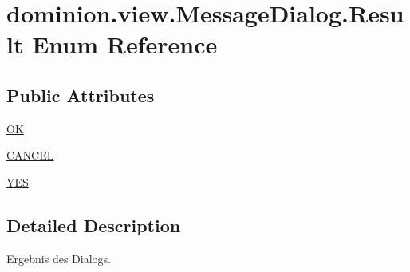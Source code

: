 \hypertarget{enumdominion_1_1view_1_1MessageDialog_1_1Result}{\section{dominion.\-view.\-Message\-Dialog.\-Result \-Enum \-Reference}
\label{enumdominion_1_1view_1_1MessageDialog_1_1Result}
}
\subsection*{\-Public \-Attributes}
\begin{DoxyCompactItemize}
\item 
\hyperlink{enumdominion_1_1view_1_1MessageDialog_1_1Result_a2594daef8b5aca7f65160b3f7d778d9e}{\-O\-K}
\item 
\hyperlink{enumdominion_1_1view_1_1MessageDialog_1_1Result_a33f35d9f5fd6479a8b0f0e93ff2c688d}{\-C\-A\-N\-C\-E\-L}
\item 
\hyperlink{enumdominion_1_1view_1_1MessageDialog_1_1Result_add8d3139246db9219a3ab01a8634cd13}{\-Y\-E\-S}
\end{DoxyCompactItemize}


\subsection{\-Detailed \-Description}
\-Ergebnis des \-Dialogs. 

